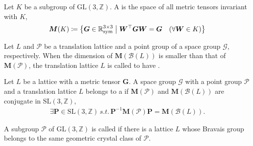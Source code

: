 \begin{screen}
  \begin{definition}
    Let $K$ be a subgroup of $\mathrm{GL}(3, \mathbb{Z})$.
    A  is the space of all metric tensors invariant with $K$,
    \begin{align}
      \bm{M}( K ) \coloneqq \left\{  \bm{G} \in \mathbb{R}^{3 \times 3}_{\mathrm{sym}}  \mathrel{}\middle|\mathrel{}  \bm{W}^{\top}\bm{G}\bm{W} = \bm{G} \quad (\forall \bm{W} \in K )  \right\}
    \end{align}
  \end{definition}
\end{screen}

Let $L$ and $\mathcal{P}$ be a translation lattice and a point group of a space group $\mathcal{G}$, respectively.
When the dimension of $\bm{M}(\mathcal{B}(L))$ is smaller than that of $\bm{M}(\mathcal{P})$, the translation lattice $L$ is called to have .


\begin{screen}
  \begin{definition}
    Let $L$ be a lattice with a metric tensor $\bm{G}$.
    A space group $\mathcal{G}$ with a point group $\mathcal{P}$ and a translation lattice $L$ belongs to a  if $\bm{M}(\mathcal{P})$ and $\bm{M}(\mathcal{B}(L))$ are conjugate in $\mathrm{SL}(3, \mathbb{Z})$,
    \begin{align}
      \exists \bm{P} \in \mathrm{SL}(3, \mathbb{Z}) \,s.t.\, \bm{P}^{-1} \bm{M}(\mathcal{P}) \bm{P} = \bm{M}(\mathcal{B}(L)).
    \end{align}
  \end{definition}
\end{screen}


\begin{screen}
  \begin{definition}[holohedry]
    A subgroup $\mathcal{P}$ of $\mathrm{GL}(3, \mathbb{Z})$ is called  if there is a lattice $L$ whose Bravais group belongs to the same geometric crystal class of $\mathcal{P}$.
  \end{definition}
\end{screen}

